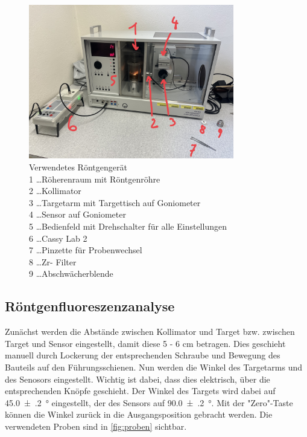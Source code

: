 \documentclass[12pt,english,ngerman]{scrartcl}
\begin{document}
\begin{figure}[H]
	\begin{center}
		\includegraphics[width =0.8\textwidth]{./figures/aufbau.jpg}
	\end{center}
	\caption[Verwendetes Röntgengerät]
	{Verwendetes Röntgengerät\\
	1 \dots Röherenraum mit Röntgenröhre\\
	2 \dots Kollimator\\
	3 \dots Targetarm mit Targettisch auf Goniometer\\
	4 \dots Sensor auf Goniometer\\
	5 \dots Bedienfeld mit Drehschalter für alle Einstellungen\\
	6 \dots Cassy Lab 2\\
	7 \dots Pinzette für Probenwechsel\\
	8 \dots Zr- Filter\\
	9 \dots Abschwächerblende
	}\label{fig:aufabau}
\end{figure}

\subsection{Röntgenfluoreszenzanalyse}

Zunächst werden die Abstände zwischen Kollimator und Target bzw. zwischen Target und Sensor eingestellt, damit diese 
5 - 6 cm betragen. Dies geschieht manuell durch Lockerung der entsprechenden Schraube und Bewegung des Bauteils auf den
Führungsschienen.
Nun werden die Winkel des Targetarms und 
des Senosors eingestellt. Wichtig ist dabei, dass dies elektrisch, über die entsprechenden Knöpfe geschieht.
Der Winkel des Targets wird dabei auf \SI{45.0(2)}{\degree} eingestellt, der des Sensors auf \SI{90.0(2)}{\degree}.
Mit der "Zero"-Taste können die Winkel zurück in die Ausgangsposition gebracht werden.
Die verwendeten Proben sind in \autoref{fig:proben} sichtbar.
\end{document}
